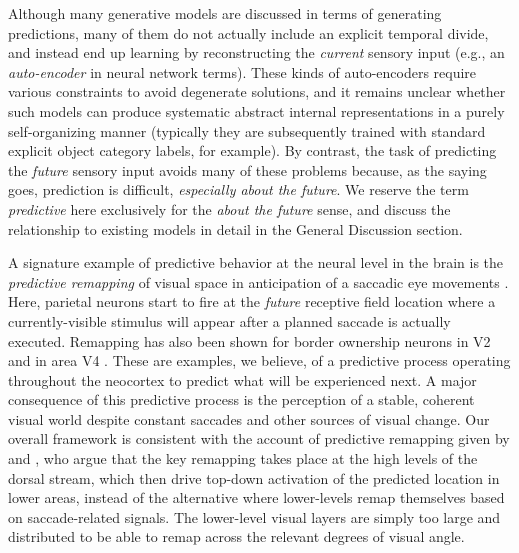\documentclass[11pt,twoside]{article}
\newif\myifpdf
\begin{document}
Although many generative models are discussed in terms of generating predictions, many of them do not actually include an explicit temporal divide, and instead end up learning by reconstructing the {\em current} sensory input (e.g., an {\em auto-encoder} in neural network terms).  These kinds of auto-encoders require various constraints to avoid degenerate solutions, and it remains unclear whether such models can produce systematic abstract internal representations in a purely self-organizing manner (typically they are subsequently trained with standard explicit object category labels, for example).  By contrast, the task of predicting the {\em future} sensory input avoids many of these problems because, as the saying goes, prediction is difficult, {\em especially about the future}.  We reserve the term {\em predictive} here exclusively for the {\em about the future} sense, and discuss the relationship to existing models in detail in the General Discussion section.

A signature example of predictive behavior at the neural level in the brain is the {\em predictive remapping} of visual space in anticipation of a saccadic eye movements \cite{DuhamelColbyGoldberg92,ColbyDuhamelGoldberg97,GottliebKusunokiGoldberg98,NakamuraColby02,MarinoMazer16}.  Here, parietal neurons start to fire at the {\em future} receptive field location where a currently-visible stimulus will appear after a planned saccade is actually executed. Remapping has also been shown for border ownership neurons in V2 \cite{OHerronvonderHeydt13} and in area V4 \cite{NeupaneGuittonPack16}. These are examples, we believe, of a predictive process operating throughout the neocortex to predict what will be experienced next.  A major consequence of this predictive process is the perception of a stable, coherent visual world despite constant saccades and other sources of visual change.  Our overall framework is consistent with the account of predictive remapping given by  and , who argue that the key remapping takes place at the high levels of the dorsal stream, which then drive top-down activation of the predicted location in lower areas, instead of the alternative where lower-levels remap themselves based on saccade-related signals.  The lower-level visual layers are simply too large and distributed to be able to remap across the relevant degrees of visual angle.
\end{document}
